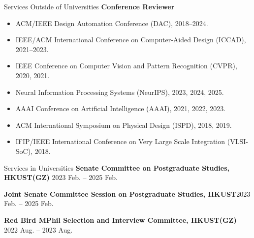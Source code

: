 \begin{rSection}{Services Outside of Universities}
\textbf{Conference Reviewer}
\begin{itemize}
    \item ACM/IEEE Design Automation Conference (DAC), 2018--2024.
    \item IEEE/ACM International Conference on Computer-Aided Design (ICCAD), 2021--2023.
    \item IEEE Conference on Computer Vision and Pattern Recognition (CVPR), 2020, 2021.
    \item Neural Information Processing Systems (NeurIPS), 2023, 2024, 2025.
    \item AAAI Conference on Artificial Intelligence (AAAI), 2021, 2022, 2023.
    \item ACM International Symposium on Physical Design (ISPD), 2018, 2019.
    \item IFIP/IEEE International Conference on Very Large Scale Integration (VLSI-SoC), 2018.
\end{itemize}
\end{rSection}

\begin{rSection}{Services in Universities}
{\bf Senate Committee on Postgraduate Studies, HKUST(GZ)}\hfill { 2023 Feb. -- 2025 Feb.}

{\bf Joint Senate Committee Session on Postgraduate Studies, HKUST}\hfill {2023 Feb. -- 2025 Feb.}

{\bf Red Bird MPhil Selection and Interview Committee, HKUST(GZ)}\hfill { 2022 Aug. -- 2023 Aug.}
\end{rSection}
